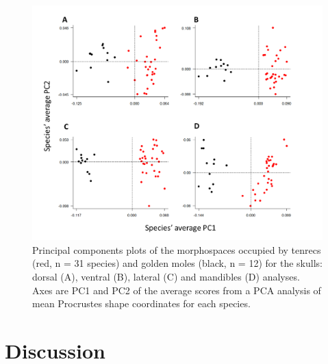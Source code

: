 \documentclass[12pt,a4paper]{article}
\begin{document}
	\begin{figure}[H]
	\centering
	\includegraphics[width=1\linewidth]{figures/FourPlotPCA.png}
	\caption[Principal components plots of the morphospaces occupied by tenrecs and golden moles]
		{Principal components plots of the morphospaces occupied by tenrecs (red, n = 31 species) and golden moles (black, n = 12) for the skulls: dorsal (A), ventral (B), lateral (C) and mandibles (D) analyses. Axes are PC1 and PC2 of the average scores from a PCA analysis of mean Procrustes shape coordinates for each species. }
	\label{fig:fourPCA}
	\end{figure}


\section{Discussion} 

\end{document}
